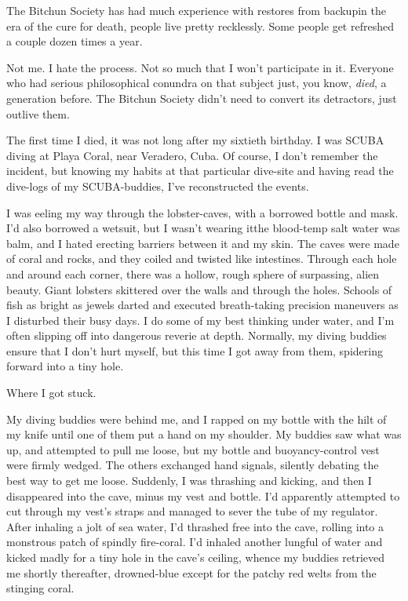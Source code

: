 The Bitchun Society has had much experience with restores from
backup{\dash}in the era of the cure for death, people live pretty
recklessly. Some people get refreshed a couple dozen times a year.

Not me. I hate the process. Not so much that I won't participate in
it. Everyone who had serious philosophical conundra on that subject
just, you know, \emph{died}, a generation before. The Bitchun
Society didn't need to convert its detractors, just outlive them.

The first time I died, it was not long after my sixtieth birthday.
I was SCUBA diving at Playa Coral, near Veradero, Cuba. Of course,
I don't remember the incident, but knowing my habits at that
particular dive-site and having read the dive-logs of my
SCUBA-buddies, I've reconstructed the events.

I was eeling my way through the lobster-caves, with a borrowed
bottle and mask. I'd also borrowed a wetsuit, but I wasn't wearing
it{\dash}the blood-temp salt water was balm, and I hated erecting
barriers between it and my skin. The caves were made of coral and
rocks, and they coiled and twisted like intestines. Through each
hole and around each corner, there was a hollow, rough sphere of
surpassing, alien beauty. Giant lobsters skittered over the walls
and through the holes. Schools of fish as bright as jewels darted
and executed breath-taking precision maneuvers as I disturbed their
busy days. I do some of my best thinking under water, and I'm often
slipping off into dangerous reverie at depth. Normally, my diving
buddies ensure that I don't hurt myself, but this time I got away
from them, spidering forward into a tiny hole.

Where I got stuck.

My diving buddies were behind me, and I rapped on my bottle with
the hilt of my knife until one of them put a hand on my shoulder.
My buddies saw what was up, and attempted to pull me loose, but my
bottle and buoyancy-control vest were firmly wedged. The others
exchanged hand signals, silently debating the best way to get me
loose. Suddenly, I was thrashing and kicking, and then I
disappeared into the cave, minus my vest and bottle. I'd apparently
attempted to cut through my vest's straps and managed to sever the
tube of my regulator. After inhaling a jolt of sea water, I'd
thrashed free into the cave, rolling into a monstrous patch of
spindly fire-coral. I'd inhaled another lungful of water and kicked
madly for a tiny hole in the cave's ceiling, whence my buddies
retrieved me shortly thereafter, drowned-blue except for the patchy
red welts from the stinging coral.

